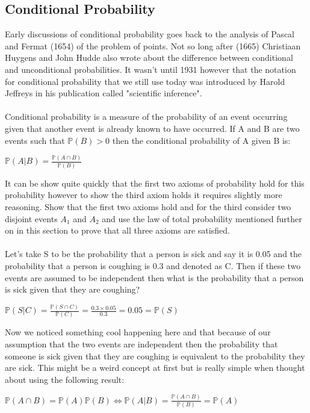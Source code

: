 \documentclass[,oneside]{article}
\begin{document}
\begin{enumerate}
\subsection{Conditional Probability}
Early discussions of conditional probability goes back to the analysis of Pascal and Fermat (1654) of the problem of points. Not so long after (1665) Christiaan Huygens and John Hudde also wrote about the difference between conditional and unconditional probabilities. It wasn't until 1931 however that the notation for conditional probability that we still use today was introduced by Harold Jeffreys in his publication called "scientific inference".\\ \\
Conditional probability is a measure of the probability of an event occurring given that another event is already known to have occurred. If A and B are two events such that $\mathbb{P}(B) > 0$ then the conditional probability of A given B is:
\begin{center}
$\mathbb{P}(A|B)=\frac{\mathbb{P}(A\cap B)}{\mathbb{P}(B)}$
\end{center} 
It can be show quite quickly that the first two axioms of probability hold for this probability however to show the third axiom holds it requires slightly more reasoning. Show that the first two axioms hold and for the third consider two disjoint events $A_1$ and $A_2$ and use the law of total probability mentioned further on in this section to prove that all three axioms are satisfied.\\ \\
Let's take S to be the probability that a person is sick and say it is 0.05 and the probability that a person is coughing is 0.3 and denoted as C. Then if these two events are assumed to be independent then what is the probability that a person is sick given that they are coughing?
\begin{center}
$\mathbb{P}(S|C)=\frac{\mathbb{P}(S\cap C)}{\mathbb{P}(C)}=\frac{0.3\times 0.05}{0.3}=0.05=\mathbb{P}(S)$
\end{center}
Now we noticed something cool happening here and that because of our assumption that the two events are independent then the probability that someone is sick given that they are coughing is equivalent to the probability they are sick. This might be a weird concept at first but is really simple when thought about using the following result:
\begin{center}
$\mathbb{P}(A \cap B) = \mathbb{P}(A)\mathbb{P}(B) \iff \mathbb{P}(A|B)=\frac{\mathbb{P}(A\cap B)}{\mathbb{P}(B)}=\mathbb{P}(A)$

\end{center}
\end{enumerate}
\end{document}
